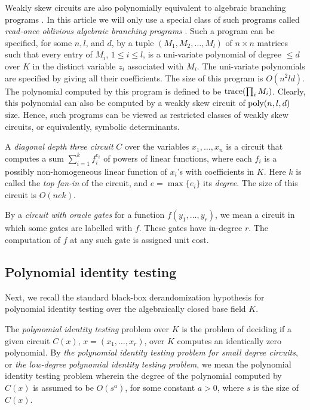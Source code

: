 \documentclass[11pt]{article}
\begin{document}
Weakly skew circuits are also polynomially equivalent to algebraic branching programs
\cite{yehu,fs2}. In this article we will only use  a special class of such programs
called {\em read-once oblivious algebraic 
branching programs} \cite{fs2}. 
Such a  program can be specified, for some $n,l$, and $d$, 
by a tuple $(M_1, M_2,\ldots, M_l)$ of $n \times n$
matrices such that every entry of $M_i$, $ 1 \le i \le l$,  is a 
uni-variate polynomial of degree $\le d$
over $K$ in the distinct variable $z_i$ associated with $M_i$.
The uni-variate polynomials are  specified by giving all their coefficients.
The size of this program is $O(n^2 l  d)$.
The polynomial computed by this program  is defined to be ${\mbox {trace}}(\prod_i M_i)$. 
Clearly, this polynomial  can also be computed by a weakly skew circuit 
of ${\mbox {poly}}(n,l,d)$ size. Hence,
such programs can be viewed as restricted classes of weakly skew circuits, or equivalently,
symbolic determinants.

A {\em diagonal depth three circuit} \cite{saxena} $C$
over the variables $x_1,\ldots,x_n$  is a circuit that computes  a sum 
$\sum_{i=1}^k f_i^{e_i}$
of powers of linear functions,
where each $f_i$ is a possibly non-homogeneous linear function of
 $x_i$'s with coefficients in $K$.
Here $k$ is called the {\em top fan-in} of the circuit, and 
$e=\max\{e_{i}\}$  its {\em degree}. The size of this circuit is $O(n e k)$.

By a {\em circuit with oracle gates}
for a function $f(y_1,\ldots,y_r)$, we mean a circuit
in which some  gates are labelled with $f$. These gates have in-degree $r$. 
The computation of $f$ at any such gate  is assigned unit cost.


\subsection{Polynomial identity testing}\label{sblackstd}
Next, we   recall    the standard black-box derandomization hypothesis 
for   polynomial identity testing  \cite{schnorr,impa,russell,agrawal} over the  algebraically
closed base field $K$.

The {\em polynomial identity testing}    problem over $K$  is 
the problem of deciding if a given  circuit $C(x)$,
$x=(x_1,\ldots,x_r)$, over $K$ 
computes an identically zero polynomial. 
By {\em the polynomial identity testing problem for  small degree circuits}, or {\em the low-degree polynomial identity testing problem}, we mean the polynomial identity testing problem wherein
the degree of the polynomial computed by $C(x)$ is assumed to be $O(s^a)$, for some constant $a>0$, where $s$ is the size of $C(x)$.
\end{document}
